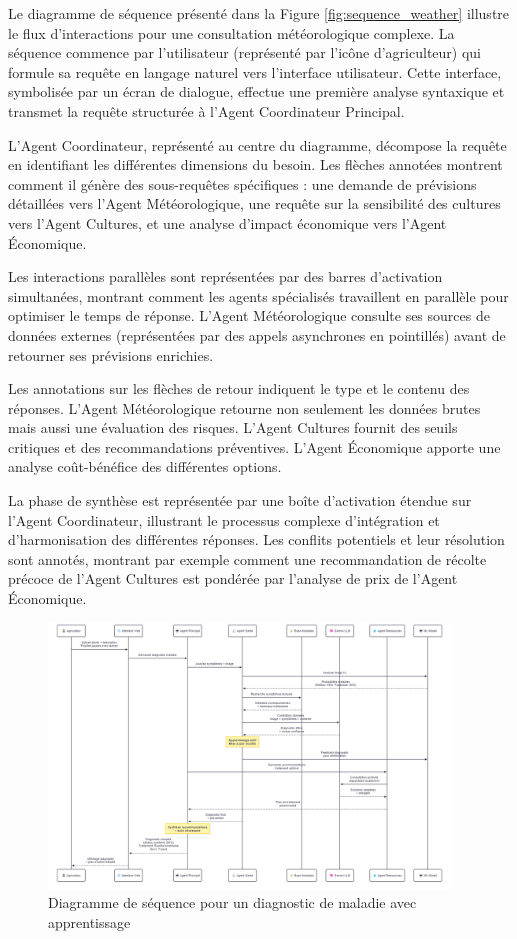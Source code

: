 Le diagramme de séquence présenté dans la Figure \ref{fig:sequence_weather} illustre le flux d'interactions pour une consultation météorologique complexe. La séquence commence par l'utilisateur (représenté par l'icône d'agriculteur) qui formule sa requête en langage naturel vers l'interface utilisateur. Cette interface, symbolisée par un écran de dialogue, effectue une première analyse syntaxique et transmet la requête structurée à l'Agent Coordinateur Principal.

L'Agent Coordinateur, représenté au centre du diagramme, décompose la requête en identifiant les différentes dimensions du besoin. Les flèches annotées montrent comment il génère des sous-requêtes spécifiques : une demande de prévisions détaillées vers l'Agent Météorologique, une requête sur la sensibilité des cultures vers l'Agent Cultures, et une analyse d'impact économique vers l'Agent Économique.

Les interactions parallèles sont représentées par des barres d'activation simultanées, montrant comment les agents spécialisés travaillent en parallèle pour optimiser le temps de réponse. L'Agent Météorologique consulte ses sources de données externes (représentées par des appels asynchrones en pointillés) avant de retourner ses prévisions enrichies.

Les annotations sur les flèches de retour indiquent le type et le contenu des réponses. L'Agent Météorologique retourne non seulement les données brutes mais aussi une évaluation des risques. L'Agent Cultures fournit des seuils critiques et des recommandations préventives. L'Agent Économique apporte une analyse coût-bénéfice des différentes options.

La phase de synthèse est représentée par une boîte d'activation étendue sur l'Agent Coordinateur, illustrant le processus complexe d'intégration et d'harmonisation des différentes réponses. Les conflits potentiels et leur résolution sont annotés, montrant par exemple comment une recommandation de récolte précoce de l'Agent Cultures est pondérée par l'analyse de prix de l'Agent Économique.

\begin{figure}[H]
\centering
\includegraphics[width=0.95\textwidth]{images/sequence_diagram_disease.png}
\caption{Diagramme de séquence pour un diagnostic de maladie avec apprentissage}
\label{fig:sequence_disease}
\end{figure}

